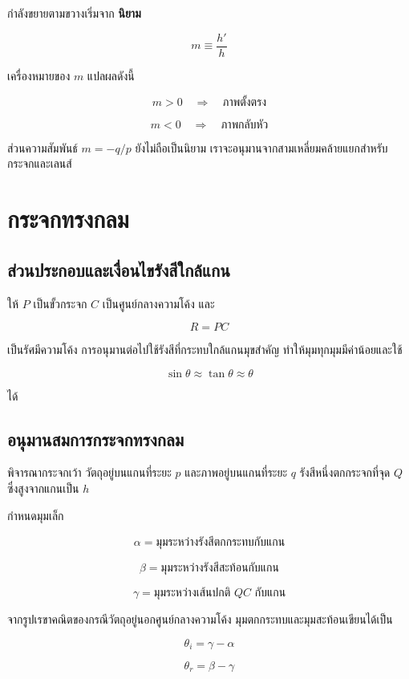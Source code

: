 กำลังขยายตามขวางเริ่มจาก \textbf{นิยาม}

\begin{tcolorbox}[title={นิยาม: กำลังขยายตามขวาง}]
\[
\boxed{m\equiv\frac{h'}{h}}
\]
\end{tcolorbox}

เครื่องหมายของ $m$ แปลผลดังนี้

\[
m>0 \quad\Rightarrow\quad \text{ภาพตั้งตรง}
\]

\[
m<0 \quad\Rightarrow\quad \text{ภาพกลับหัว}
\]

ส่วนความสัมพันธ์ $m=-q/p$ ยังไม่ถือเป็นนิยาม เราจะอนุมานจากสามเหลี่ยมคล้ายแยกสำหรับกระจกและเลนส์

\section{กระจกทรงกลม}

\subsection{ส่วนประกอบและเงื่อนไขรังสีใกล้แกน}

ให้ $P$ เป็นขั้วกระจก $C$ เป็นศูนย์กลางความโค้ง และ

\[
R=PC
\]

เป็นรัศมีความโค้ง การอนุมานต่อไปใช้รังสีที่กระทบใกล้แกนมุขสำคัญ ทำให้มุมทุกมุมมีค่าน้อยและใช้

\[
\sin\theta\approx\tan\theta\approx\theta
\]

ได้

\subsection{อนุมานสมการกระจกทรงกลม}

พิจารณากระจกเว้า วัตถุอยู่บนแกนที่ระยะ $p$ และภาพอยู่บนแกนที่ระยะ $q$ รังสีหนึ่งตกกระจกที่จุด $Q$ ซึ่งสูงจากแกนเป็น $h$

กำหนดมุมเล็ก

\[
\alpha=\text{มุมระหว่างรังสีตกกระทบกับแกน}
\]

\[
\beta=\text{มุมระหว่างรังสีสะท้อนกับแกน}
\]

\[
\gamma=\text{มุมระหว่างเส้นปกติ }QC\text{ กับแกน}
\]

จากรูปเรขาคณิตของกรณีวัตถุอยู่นอกศูนย์กลางความโค้ง มุมตกกระทบและมุมสะท้อนเขียนได้เป็น

\[
\theta_i=\gamma-\alpha
\]

\[
\theta_r=\beta-\gamma
\]

